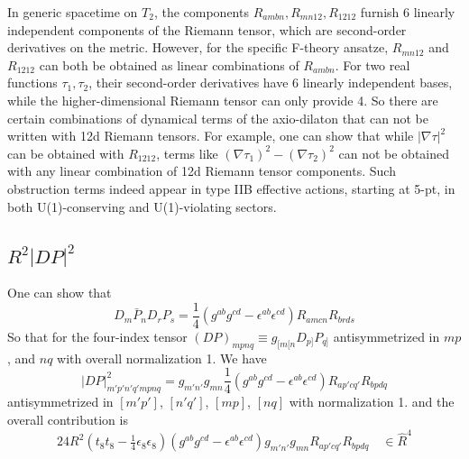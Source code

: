 In generic spacetime on $T_2$, the components $R_{ambn}, R_{mn12}, R_{1212}$ furnish 6 linearly independent components of the Riemann tensor, which are second-order derivatives on the metric.
However, for the specific F-theory ansatze, $R_{mn12}$ and $R_{1212}$ can both be obtained as linear combinations of $R_{ambn}$. For two real functions $\tau_1, \tau_2$, their second-order derivatives have 6 linearly independent bases, while the higher-dimensional Riemann tensor can only provide 4. So there are certain combinations of dynamical terms of the axio-dilaton that can not be written with 12d Riemann tensors.
For example, one can show that while $|\nabla \tau|^2$ can be obtained with $R_{1212}$, terms like $(\nabla \tau_1)^2 - (\nabla \tau_2)^2$ can not be obtained with any linear combination of 12d Riemann tensor components.
Such obstruction terms indeed appear in type IIB effective actions, starting at 5-pt, in both U(1)-conserving and U(1)-violating sectors.





\subsection{$R^2|DP|^2$}
One can show that 
\begin{equation}
D_m\bar{P}_n D_r P_s = \frac{1}{4}(g^{ab}g^{cd} - \epsilon^{ab}\epsilon^{cd})R_{amcn}R_{brds}
\end{equation}
So that for the four-index tensor $(DP)_{mpnq} \equiv g_{[m[n} D_{p]} P_{q]}$ antisymmetrized in $mp$, and $nq$ with overall normalization 1. 
We have
\begin{equation}
|DP|^2_{m'p'n'q' mpnq} = g_{m'n'}g_{mn} \frac{1}{4}(g^{ab}g^{cd} - \epsilon^{ab}\epsilon^{cd})R_{a p' c q'}R_{b p d q}
\end{equation}
antisymmetrized in $[m'p']$, $[n'q']$, $[mp]$, $[nq]$ with normalization 1.
and the overall contribution is
\begin{equation}
24R^2 (t_8t_8-\tfrac14\epsilon_8\epsilon_8)(g^{ab}g^{cd} - \epsilon^{ab}\epsilon^{cd}) g_{m'n'}g_{mn}R_{a p' c q'}R_{b p d q}
\quad \in \hat{R}^4
\end{equation}

